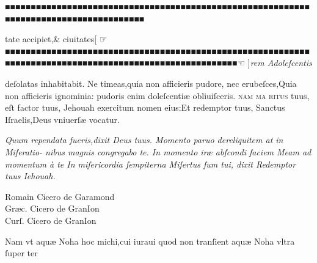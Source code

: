 \documentclass[letterpaper]{article}
\newcommand{\threecolumntypefacenames}[3]{\begin{multicols}{3}
		\tiny
		\hfill \qquad \qquad \qquad \qquad #1\hspace*{\fill}\\
		\columnbreak
		\hfill #2\hspace*{\fill}\\
		\columnbreak
		\hfill #3\qquad \qquad \qquad \qquad \hspace*{\fill}
\end{multicols}}
\begin{document}
{\begin{multicols}{2}
	\columnbreak
	\fontsize{7}{9}\selectfont
	\justifying
	\noindent
	\textit{■■■■■■■■■■■■■■■■■■■■■■■■■■■■■■■■■■■■■■■■■■■■■■■■■■■■■■■■■■■■■■■■■■■■■■■■■■■■■■■■■■■■■■}
\end{multicols}
\fontsize{8}{9}\selectfont
\vspace{-2.3\baselineskip}
\noindent tate accipiet,\& ciuitates\hfill\hfill {\normalsize [ ☞}\hfill ■■■■■■■■■■■■■■■■■■■■■■■■■■■■■■■■■■■■■■■■■■■■■■■■■■■■■■■■■■■■■■■■■■■■■■■■■■■■■■■■■■■■■■■■■■■■■■■■■■■■■■■■\hfill{\normalsize ☜ ]}\hfill \textit{rem Adoleſcentis}
\vspace{-1.2\baselineskip}
\begin{multicols}{2}
	\fontsize{8}{9}\selectfont
	\justifying
	\noindent deſolatas inhabitabit. Ne timeas,quia non afficieris pudore, nec erubeſces,Quia\linebreak
	non afficieris ignominia: pudoris enim doleſcenti\ae{} obliuiſceris. \textsc{nam ma\linebreak
		ritus} tuus, eſt factor tuus, Jehouah exercitum nomen eius:Et redemptor tuus,\linebreak
	Sanctus Iſraelis,Deus vniuerſ\ae{} vocatur.

	\columnbreak
	\fontsize{7}{9}\selectfont
	\justifying
	\noindent
	\textit{Quum rependata fueris,dixit Deus tuus. Momento paruo dereliquitem at in Miſeratio-\linebreak
		nibus magnis congregabo te. In momento ir\ae{} abſcondi faciem Meam ad momentum \`a te\linebreak
		In miſericordia ſempiterna Miſertus ſum tui, dixit Redemptor tuus Iehouah.}
\end{multicols}
\threecolumntypefacenames{Romain Cicero de Garamond}{Gr\ae{}c. Cicero de GranIon}{Curſ. Cicero de GranIon}
\vspace{-3\baselineskip}
\begin{multicols}{2}
	\fontsize{7}{8}\selectfont
	\justifying
	\noindent \quad Nam vt aqu\ae{} Noha hoc michi,cui iuraui quod non tranſient aqu\ae{} Noha vltra ſuper ter\linebreak


\end{multicols}}
\end{document}
